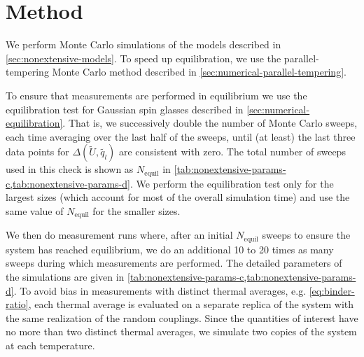 \section{Method}
\label{sec:nonextensive-method}

We perform Monte Carlo simulations of the models described in
\cref{sec:nonextensive-models}. To speed up equilibration, we use the
parallel-tempering Monte Carlo method described in
\cref{sec:numerical-parallel-tempering}.

To ensure that measurements are performed in equilibrium we use the
equilibration test for Gaussian spin glasses described in
\cref{sec:numerical-equilibration}. That is, we successively double the number
of Monte Carlo sweeps, each time averaging over the last half of the sweeps,
until (at least) the last three data points for
$\Delta(\widetilde{U},\widetilde{q_l})$ are consistent with zero. The total
number of sweeps used in this check is shown as $N_{\mathrm{equil}}$ in
\cref{tab:nonextensive-params-c,tab:nonextensive-params-d}. We perform the
equilibration test only for the largest sizes (which account for most of the
overall simulation time) and use the same value of $N_{\mathrm{equil}}$ for the
smaller sizes.

We then do measurement runs where, after an initial $N_{\mathrm{equil}}$ sweeps
to ensure the system has reached equilibrium, we do an additional 10 to 20
times as many sweeps during which measurements are performed. The detailed
parameters of the simulations are given in
\cref{tab:nonextensive-params-c,tab:nonextensive-params-d}. To avoid bias in
measurements with distinct thermal averages, e.g. \cref{eq:binder-ratio}, each
thermal average is evaluated on a separate replica of the system with the same
realization of the random couplings. Since the quantities of interest have no
more than two distinct thermal averages, we simulate two copies of the system
at each temperature.


